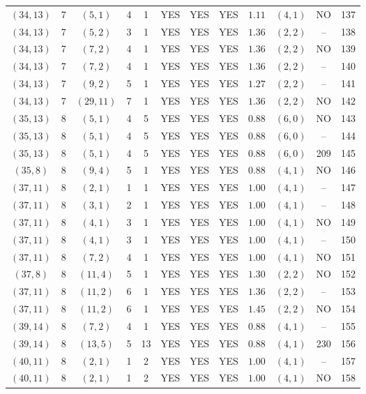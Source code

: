 \begin{longtable}{|c|c|c|c|c|c|c|c|c|c|c|c|}
$(34,13)$ & 7 & $(5,1)$ & 4 & 1 & YES & YES & YES & $1.11$ & $(4,1)$ & NO & 137\\
$(34,13)$ & 7 & $(5,2)$ & 3 & 1 & YES & YES & YES & $1.36$ & $(2,2)$ & -- & 138\\
$(34,13)$ & 7 & $(7,2)$ & 4 & 1 & YES & YES & YES & $1.36$ & $(2,2)$ & NO & 139\\
$(34,13)$ & 7 & $(7,2)$ & 4 & 1 & YES & YES & YES & $1.36$ & $(2,2)$ & -- & 140\\
$(34,13)$ & 7 & $(9,2)$ & 5 & 1 & YES & YES & YES & $1.27$ & $(2,2)$ & -- & 141\\
$(34,13)$ & 7 & $(29,11)$ & 7 & 1 & YES & YES & YES & $1.36$ & $(2,2)$ & NO & 142\\
$(35,13)$ & 8 & $(5,1)$ & 4 & 5 & YES & YES & YES & $0.88$ & $(6,0)$ & NO & 143\\
$(35,13)$ & 8 & $(5,1)$ & 4 & 5 & YES & YES & YES & $0.88$ & $(6,0)$ & -- & 144\\
$(35,13)$ & 8 & $(5,1)$ & 4 & 5 & YES & YES & YES & $0.88$ & $(6,0)$ & 209 & 145\\
$(35,8)$ & 8 & $(9,4)$ & 5 & 1 & YES & YES & YES & $0.88$ & $(4,1)$ & NO & 146\\
$(37,11)$ & 8 & $(2,1)$ & 1 & 1 & YES & YES & YES & $1.00$ & $(4,1)$ & -- & 147\\
$(37,11)$ & 8 & $(3,1)$ & 2 & 1 & YES & YES & YES & $1.00$ & $(4,1)$ & -- & 148\\
$(37,11)$ & 8 & $(4,1)$ & 3 & 1 & YES & YES & YES & $1.00$ & $(4,1)$ & NO & 149\\
$(37,11)$ & 8 & $(4,1)$ & 3 & 1 & YES & YES & YES & $1.00$ & $(4,1)$ & -- & 150\\
$(37,11)$ & 8 & $(7,2)$ & 4 & 1 & YES & YES & YES & $1.00$ & $(4,1)$ & NO & 151\\
$(37,8)$ & 8 & $(11,4)$ & 5 & 1 & YES & YES & YES & $1.30$ & $(2,2)$ & NO & 152\\
$(37,11)$ & 8 & $(11,2)$ & 6 & 1 & YES & YES & YES & $1.36$ & $(2,2)$ & -- & 153\\
$(37,11)$ & 8 & $(11,2)$ & 6 & 1 & YES & YES & YES & $1.45$ & $(2,2)$ & NO & 154\\
$(39,14)$ & 8 & $(7,2)$ & 4 & 1 & YES & YES & YES & $0.88$ & $(4,1)$ & -- & 155\\
$(39,14)$ & 8 & $(13,5)$ & 5 & 13 & YES & YES & YES & $0.88$ & $(4,1)$ & 230 & 156\\
$(40,11)$ & 8 & $(2,1)$ & 1 & 2 & YES & YES & YES & $1.00$ & $(4,1)$ & -- & 157\\
$(40,11)$ & 8 & $(2,1)$ & 1 & 2 & YES & YES & YES & $1.00$ & $(4,1)$ & NO & 158\\

\end{longtable}
